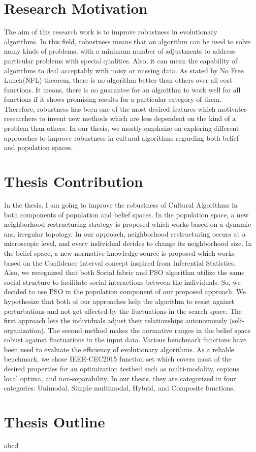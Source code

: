 \section{Research Motivation}
The aim of this research work is to improve robustness in evolutionary algorithms.  In this field, robustness means that an algorithm can be used to solve many kinds of problems, with a minimum number of adjustments to address particular problems with special qualities. Also, it can mean the capability of algorithms to deal acceptably with noisy or missing data.\newline
As stated by No Free Lunch(NFL) theorem, there is no algorithm better than others over all cost functions. It means, there is no guarantee for an algorithm to work well for all functions if it shows promising results for a particular category of them. Therefore, robustness has been one of the most desired features which motivates researchers to invent new methods which are less dependent on the kind of a problem than others. In our thesis, we mostly emphaize on exploring different approaches to improve robustness in cultural algorithms regarding both belief and population spaces.\newline
\section{Thesis Contribution}
In the thesis, I am going to improve the robustness of Cultural Algorithms in both components of population and belief spaces. In the population space, a new neighborhood restructuring strategy is proposed which works based on a dynamic and irregular topology. In our approach, neighborhood restructuring occurs at a microscopic level, and every individual decides to change its neighborhood size. In the belief space, a new normative knowledge source is proposed which works based on the Confidence Interval concept inspired from Inferential Statistics. Also, we recognized that both Social fabric and PSO algorithm utilize the same social structure to facilitate social interactions between the individuals. So, we decided to use PSO in the population component of our proposed approach. We hypothesize that both of our approaches help the algorithm to resist against perturbations and not get affected by the fluctuations in the search space. The first approach lets the individuals adjust their relationships autonomously (self-organization). The second method makes the normative ranges in the belief space robust against fluctuations in the input data. \newline Various benchmark functions have been used to evaluate the efficiency of evolutionary algorithms. As a reliable benchmark, we chose IEEE-CEC2015 function set which covers most of the desired properties for an optimization testbed such as multi-modality, copious local optima, and non-separability. In our thesis, they are categorized in four categories: Unimodal, Simple multimodal, Hybrid, and Composite functions.
\section{Thesis Outline}
abcd